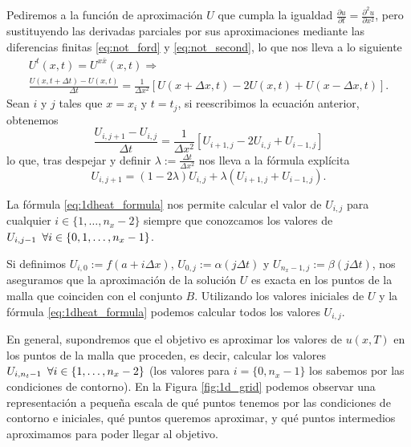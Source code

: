 Pediremos a la función de aproximación $U$ que cumpla la igualdad $\frac{\partial u}{\partial t} = \frac{\partial ^2u}{\partial x^2}$, pero sustituyendo las derivadas parciales por sus aproximaciones mediante las diferencias finitas \eqref{eq:not_ford} y \eqref{eq:not_second}, lo que nos lleva a lo siguiente
\begin{multline} \label{eq:principio_aprox}
	U^t(x,t) = U^{x\bar{x}}(x,t) \Rightarrow \\ \frac{U(x,t+\Delta t)-U(x,t)}{\Delta t} = \frac{1}{\Delta x^2}[U(x+\Delta x,t)-2U(x,t)+U(x-\Delta x, t)].
\end{multline}
Sean $i$ y $j$ tales que $x=x_i$ y $t=t_j$, si reescribimos la ecuación anterior, obtenemos
\begin{equation}
	\frac{U_{i,j+1}-U_{i,j}}{\Delta t} = \frac{1}{\Delta x^2}[U_{i+1,j}-2U_{i,j}+U_{i-1,j}]
\end{equation}
lo que, tras despejar y definir $\lambda := \frac{\Delta t}{\Delta x^2}$ nos lleva a la fórmula explícita
\begin{equation}\label{eq:1dheat_formula}
	U_{i,j+1} = (1-2\lambda)U_{i,j}+\lambda(U_{i+1,j}+U_{i-1,j}).
\end{equation}

La fórmula \eqref{eq:1dheat_formula} nos permite calcular el valor de $U_{i,j}$ para cualquier $i\in\{1,\dots,n_x-2\}$ siempre que conozcamos los valores de $U_{i,j-1} \hspace{5px} \forall i\in\{0,1,\dots,n_x-1\}$.

Si definimos $U_{i,0}:=f(a+i\Delta x)$, $U_{0,j}:=\alpha(j\Delta t)$ y $U_{n_x-1,j}:=\beta(j\Delta t)$, nos aseguramos que la aproximación de la solución $U$ es exacta en los puntos de la malla que coinciden con el conjunto $B$. Utilizando los valores iniciales de $U$ y la fórmula \eqref{eq:1dheat_formula} podemos calcular todos los valores $U_{i,j}$.

En general, supondremos que el objetivo es aproximar los valores de $u(x,T)$ en los puntos de la malla que proceden, es decir, calcular los valores $U_{i,n_t-1} \hspace{5px} \forall i\in\{1,\dots,n_x-2\}$ (los valores para $i=\{0,n_x-1\}$ los sabemos por las condiciones de contorno). En la Figura \ref{fig:1d_grid} podemos observar una representación a pequeña escala de qué puntos tenemos por las condiciones de contorno e iniciales, qué puntos queremos aproximar, y qué puntos intermedios aproximamos para poder llegar al objetivo.


